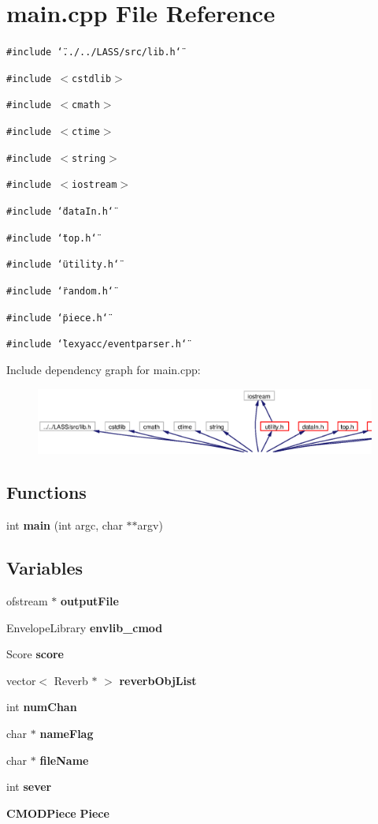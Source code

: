 \section{main.cpp File Reference}
\label{main_8cpp}
{\tt \#include \char`\"{}../../LASS/src/lib.h\char`\"{}}\par
{\tt \#include $<$cstdlib$>$}\par
{\tt \#include $<$cmath$>$}\par
{\tt \#include $<$ctime$>$}\par
{\tt \#include $<$string$>$}\par
{\tt \#include $<$iostream$>$}\par
{\tt \#include \char`\"{}data\-In.h\char`\"{}}\par
{\tt \#include \char`\"{}top.h\char`\"{}}\par
{\tt \#include \char`\"{}utility.h\char`\"{}}\par
{\tt \#include \char`\"{}random.h\char`\"{}}\par
{\tt \#include \char`\"{}piece.h\char`\"{}}\par
{\tt \#include \char`\"{}lexyacc/eventparser.h\char`\"{}}\par


Include dependency graph for main.cpp:\begin{figure}[H]
\begin{center}
\leavevmode
\includegraphics[width=418pt]{main_8cpp__incl}
\end{center}
\end{figure}
\subsection*{Functions}
\begin{CompactItemize}
\item 
int {\bf main} (int argc, char $\ast$$\ast$argv)
\end{CompactItemize}
\subsection*{Variables}
\begin{CompactItemize}
\item 
ofstream $\ast$ {\bf output\-File}
\item 
Envelope\-Library {\bf envlib\_\-cmod}
\item 
Score {\bf score}
\item 
vector$<$ Reverb $\ast$ $>$ {\bf reverb\-Obj\-List}
\item 
int {\bf num\-Chan}
\item 
char $\ast$ {\bf name\-Flag}
\item 
char $\ast$ {\bf file\-Name}
\item 
int {\bf sever}
\item 
{\bf CMODPiece} {\bf Piece}
\end{CompactItemize}


